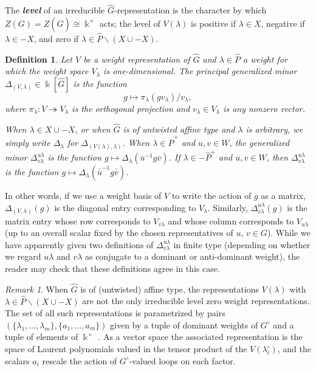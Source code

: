 \documentclass[12pt]{amsart}
\newcommand{\newword}[1]{\textbf{\emph{#1}}}
\newcommand{\kk}{\Bbbk}
\newcommand\onto{\twoheadrightarrow}
\newcommand{\ol}[1]{\overline{#1}}
\newcommand{\dol}[1]{\overline{\overline{#1}}}
\newtheorem{definition}[theorem]{Definition}
\theoremstyle{remark}
\newtheorem{remark}[theorem]{Remark}
\numberwithin{equation}{section}
\numberwithin{figure}{section}
\begin{document}
The \newword{level} of an irreducible $\widehat{G}$-representation is the character by which $Z(G) = Z(\widehat{G}) \cong \kk^\times$ acts; the level of $V(\lambda)$ is positive if $\lambda \in X$, negative if $\lambda \in -X$, and zero if $\lambda \in \widehat{P} \smallsetminus(X \cup -X)$.

\begin{definition}
  \label{def:minors}
  Let $V$ be a weight representation of $\widehat{G}$ and $\lambda \in \widehat{P}$ a weight for which the weight space $V_\lambda$ is one-dimensional.
  The principal generalized minor $\Delta_{(V,\lambda)} \in \kk[\widehat{G}]$ is the function
  \[
    g \mapsto \pi_\lambda(gv_\lambda)/v_\lambda,
  \]
  where $\pi_\lambda:V \onto V_\lambda$ is the orthogonal projection and $v_\lambda \in V_\lambda$ is any nonzero vector.

  When $\lambda \in X \cup -X$, or when $\widehat{G}$ is of untwisted affine type and $\lambda$ is arbitrary, we simply write $\Delta_\lambda$ for $\Delta_{(V(\lambda),\lambda)}$.
  When $\lambda \in \widehat{P}^+$ and $u,v\in W$, the generalized minor $\Delta^{u\lambda}_{v\lambda}$ is the function $g \mapsto \Delta_\lambda(\ol{u}^{-1}g\ol{v})$.
  If $\lambda \in -\widehat{P}^+$ and $u,v\in W$, then $\Delta^{u\lambda}_{v\lambda}$ is the function $g \mapsto \Delta_\lambda(\dol{u}^{-1}g\dol{v})$.
\end{definition}

In other words, if we use a weight basis of $V$ to write the action of $g$ as a matrix, $\Delta_{(V,\lambda)}(g)$ is the diagonal entry corresponding to $V_\lambda$.
Similarly, $\Delta^{u\lambda}_{v\lambda}(g)$ is the matrix entry whose row corresponds to $V_{v\lambda}$ and whose column corresponds to $V_{u\lambda}$ (up to an overall scalar fixed by the chosen representatives of $u$, $v \in G$).
While we have apparently given two definitions of $\Delta^{u\lambda}_{v\lambda}$ in finite type (depending on whether we regard $u\lambda$ and $v\lambda$ as conjugate to a dominant or anti-dominant weight), the reader may check that these definitions agree in this case.

\begin{remark}
  When $\widehat{G}$ is of (untwisted) affine type, the representations $V(\lambda)$ with $\lambda \in \widehat{P}\smallsetminus(X \cup - X)$ are not the only irreducible level zero weight representations.
  The set of all such representations is parametrized by pairs $(\{\lambda_1,\dotsc,\lambda_m\},\{a_1,\dotsc,a_m\})$ given by a tuple of dominant weights of $G^\circ$ and a tuple of elements of $\kk^\times$ \cite{CP86}.
  As a vector space the associated representation is the space of Laurent polynomials valued in the tensor product of the $V(\lambda_i^\circ)$, and the scalars $a_i$ rescale the action of $G^\circ$-valued loops on each factor.
\end{remark}
\end{document}
